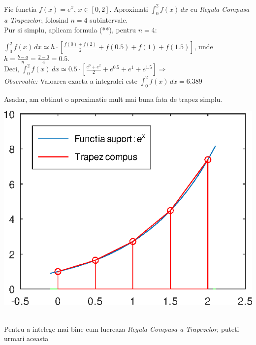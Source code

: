 \documentclass{article}
\begin{document}
\tabto{0.5cm}\begin{minipage}{0.8\textwidth}
    \vspace{0.5cm}\tabto{0.5cm} Fie functia $f(x) = e^x$, $x \in [0, 2]$. Aproximati $\int_0^2 f(x)\, dx$ cu \textit{Regula Compusa a Trapezelor}, folosind $n=4$ subintervale. \\
    
    \tabto{0.5cm} Pur si simplu, aplicam formula (**), pentru $n=4$:
    
    $\int_0^2 f(x)\, dx \simeq h \cdot [\frac{f(0) + f(2)}{2} + f(0.5) + f(1) + f(1.5)]$, unde $h = \frac{b-a}{n} = \frac{2-0}{4} = 0.5$. \\
    
    \tabto{0.5cm} Deci, $\int_0^2 f(x)\, dx \simeq 0.5 \cdot [\frac{e^0 + e^2}{2} + e^{0.5} + e^1 + e^{1.5}] \Longrightarrow$  \\
    
    \tabto{0.5cm} \textit{Observatie:} Valoarea exacta a integralei este $\int_0^2 f(x)\, dx = 6.389$
    
    \tabto{0.5cm} Asadar, am obtinut o aproximatie mult mai buna fata de trapez simplu.
\end{minipage}\hspace{0.1cm}
\begin{minipage}{0.55\textwidth}
    \includegraphics[scale=0.6]{trapez_compus_ex}
\end{minipage}\\

\tabto{0.5cm} Pentru a intelege mai bine cum lucreaza \textit{Regula Compusa a Trapezelor}, puteti urmari aceasta~
\end{document}
